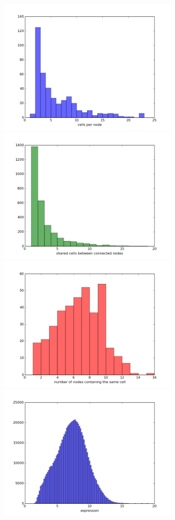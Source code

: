 \documentclass[letterpaper,10pt,english]{/usr/share/sphinx/texinputs/sphinxhowto}
\begin{document}
\begin{center}
\includegraphics[width = 90mm]{figs/f4.jpg}    
\includegraphics[width = 90mm]{figs/f5.jpg}    
\includegraphics[width = 90mm]{figs/f6.jpg}    
\includegraphics[width = 90mm]{figs/f7.jpg}    
\end{center}
    
\end{document}
